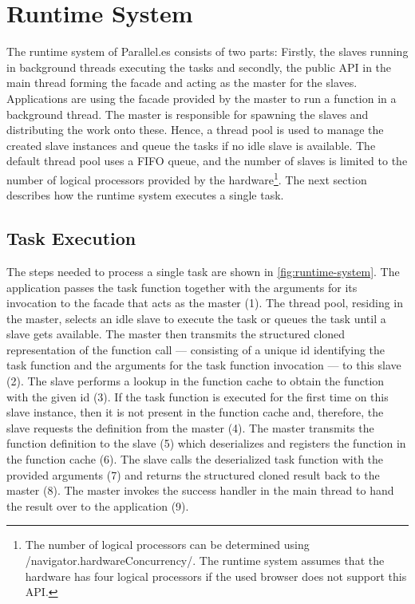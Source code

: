 \section{Runtime System}\label{sec:runtime-system}
The runtime system of Parallel.es consists of two parts: Firstly, the slaves running in background threads executing the tasks and secondly, the public API in the main thread forming the facade and acting as the master for the slaves. Applications are using the facade provided by the master to run a function in a background thread. The master is responsible for spawning the slaves and distributing the work onto these. Hence, a thread pool is used to manage the created slave instances and queue the tasks if no idle slave is available. The default thread pool uses a FIFO queue, and the number of slaves is limited to the number of logical processors provided by the hardware\footnote{The number of logical processors can be determined using \javascriptinline/navigator.hardwareConcurrency/. The runtime system assumes that the hardware has four logical processors if the used browser does not support this API.}. The next section describes how the runtime system executes a single task. 

\subsection{Task Execution}
The steps needed to process a single task are shown in \cref{fig:runtime-system}. The application passes the task function together with the arguments for its invocation to the facade that acts as the master (1). The thread pool, residing in the master, selects an idle slave to execute the task or queues the task until a slave gets available. The master then transmits the structured cloned representation of the function call --- consisting of a unique id identifying the task function and the arguments for the task function invocation --- to this slave (2). The slave performs a lookup in the function cache to obtain the function with the given id (3). If the task function is executed for the first time on this slave instance, then it is not present in the function cache and, therefore, the slave requests the definition from the master (4). The master transmits the function definition to the slave (5) which deserializes and registers the function in the function cache (6). The slave calls the deserialized task function with the provided arguments (7) and returns the structured cloned result back to the master (8). The master invokes the success handler in the main thread to hand the result over to the application (9). 

